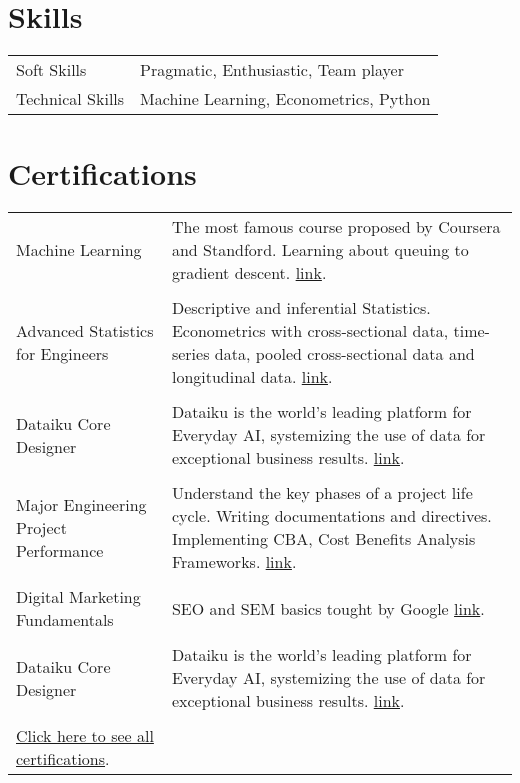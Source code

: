 \documentclass[a4paper,12pt]{article}
\begin{document}
\section{Skills}
\begin{tabularx}{\linewidth}{@{}l X@{}}
Soft Skills &  \normalsize{Pragmatic, Enthusiastic, Team player}\\
Technical Skills  &  \normalsize{ Machine Learning, Econometrics, Python}\\  
\end{tabularx}


\section{Certifications}
\begin{tabularx}{\linewidth}{@{}l X@{}}
Machine Learning &  \normalsize{The most famous course proposed by Coursera and Standford. Learning about queuing to gradient descent.}
\href{shorturl.at/hyzKV}{link}.\\
\\

Advanced Statistics for Engineers &  \normalsize{ Descriptive and inferential Statistics. Econometrics with cross-sectional data, time-series data, pooled cross-sectional data and longitudinal data.}
\href{https://github.com/Sitraka17/CV_LaTeX}{link}.\\
\\

Dataiku Core Designer &  \normalsize{Dataiku is the world's leading platform for Everyday AI, systemizing the use of data for exceptional business results.}
\href{https://verify.skilljar.com/c/bmbokwj42g8j}{link}.\\
\\

Major Engineering Project Performance &  \normalsize{  Understand the key phases of a project life cycle. Writing documentations and directives. Implementing CBA, Cost Benefits Analysis Frameworks.}
\href{https://www.coursera.org/account/accomplishments/certificate/JXMFTZMYNFGN}{link}.\\
\\

Digital Marketing Fundamentals &  \normalsize{ SEO and SEM basics tought by Google}
\href{https://www.linkedin.com/in/sitraka-matthieu-
forler/details/certifications/}{link}.\\
\\



Dataiku Core Designer &  \normalsize{ Dataiku is the world's leading platform for Everyday AI, systemizing the use of data for exceptional business results.}
\href{https://verify.skilljar.com/c/bmbokwj42g8j}{link}.\\
\\

\href{https://www.linkedin.com/in/sitraka-matthieu-forler/details/certifications/}{Click here to see all certifications}.\\




\end{tabularx}


\vfill
{}
\end{document}
